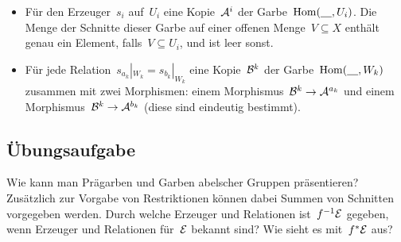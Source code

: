 \documentclass{uebblatt}
\begin{document}
\begin{itemize}
\item Für den Erzeuger~$s_i$ auf~$U_i$ eine Kopie~$\mathcal{A}^i$ der
Garbe~$\mathrm{Hom}(\underline{\quad},U_i)$. Die Menge der Schnitte dieser Garbe auf einer
offenen Menge~$V \subseteq X$ enthält genau ein Element, falls~$V \subseteq
U_i$, und ist leer sonst.
\item Für jede Relation~$s_{a_k}|_{W_k} =
s_{b_k}|_{W_k}$ eine Kopie~$\mathcal{B}^k$ der Garbe~$\mathrm{Hom}(\underline{\quad},W_k)$ zusammen
mit zwei Morphismen: einem Morphismus~$\mathcal{B}^k \to \mathcal{A}^{a_k}$ und einem
Morphismus~$\mathcal{B}^k \to \mathcal{A}^{b_k}$ (diese sind eindeutig bestimmt).
\end{itemize}


\subsection*{Übungsaufgabe}

Wie kann man Prägarben und Garben abelscher Gruppen präsentieren? Zusätzlich
zur Vorgabe von Restriktionen können dabei Summen von Schnitten vorgegeben
werden. Durch welche Erzeuger und Relationen ist~$f^{-1} \mathcal{E}$ gegeben, wenn
Erzeuger und Relationen für~$\mathcal{E}$ bekannt sind? Wie sieht es mit~$f^* \mathcal{E}$ aus?
\end{document}
